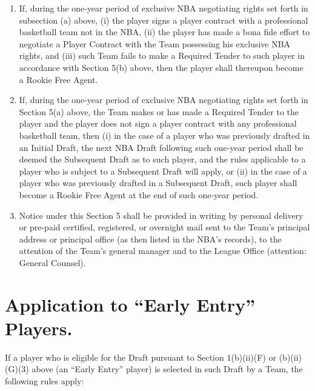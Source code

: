 \documentclass[
]{book}
\begin{document}
\begin{enumerate}
\item
  If, during the one-year period of exclusive NBA negotiating rights set forth in subsection (a) above, (i) the player signs a player contract with a professional basketball team not in the NBA, (ii) the player has made a bona fide effort to negotiate a Player Contract with the Team possessing his exclusive NBA rights, and (iii) such Team fails to make a Required Tender to such player in accordance with Section 5(b) above, then the player shall thereupon become a Rookie Free Agent.
\item
  If, during the one-year period of exclusive NBA negotiating rights set forth in Section 5(a) above, the Team makes or has made a Required Tender to the player and the player does not sign a player contract with any professional basketball team, then (i) in the case of a player who was previously drafted in an Initial Draft, the next NBA Draft following such one-year period shall be deemed the Subsequent Draft as to such player, and the rules applicable to a player who is subject to a Subsequent Draft will apply, or (ii) in the case of a player who was previously drafted in a Subsequent Draft, such player shall become a Rookie Free Agent at the end of such one-year period.
\item
  Notice under this Section 5 shall be provided in writing by personal delivery or pre-paid certified, registered, or overnight mail sent to the Team's principal address or principal office (as then listed in the NBA's records), to the attention of the Team's general manager and to the League Office (attention: General Counsel).
\end{enumerate}

\hypertarget{application-to-early-entry-players.}{%
\section{Application to ``Early Entry'' Players.}\label{application-to-early-entry-players.}}

If a player who is eligible for the Draft pursuant to Section 1(b)(ii)(F) or (b)(ii)(G)(3) above (an ``Early Entry'' player) is selected in such Draft by a Team, the following rules apply:
\end{document}
